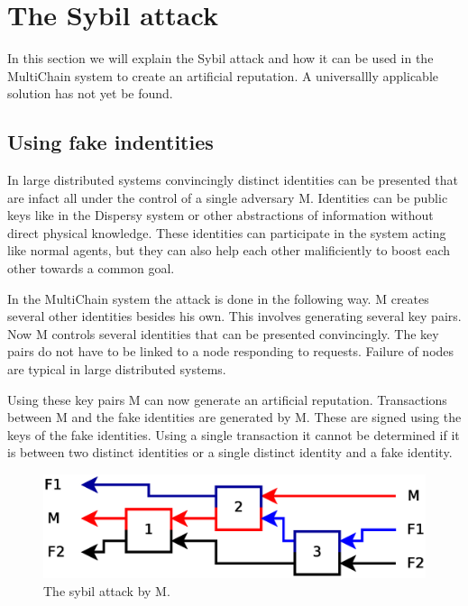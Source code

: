 \section{The Sybil attack}

In this section we will explain the Sybil attack\cite{douceur-sybil}
and how it can be used in the MultiChain system to create an artificial reputation.
A universallly applicable solution has not yet be found\cite{levine-sybilsurvey}.

\subsection{Using fake indentities}
In large distributed systems convincingly distinct identities can be presented
that are infact all under the control of a single adversary M.
Identities can be public keys like in the Dispersy system
or other abstractions of information without direct physical knowledge.
These identities can participate in the system acting like normal agents,
but they can also help each other malificiently to boost each other towards a common goal.

In the MultiChain system the attack is done in the following way.
M creates several other identities besides his own.
This involves generating several key pairs.
Now M controls several identities that can be presented convincingly.
The key pairs do not have to be linked to a node responding to requests.
Failure of nodes are typical in large distributed systems.

Using these key pairs M can now generate an artificial reputation.
Transactions between M and the fake identities are generated by M.
These are signed using the keys of the fake identities.
Using a single transaction it cannot be determined if it is between two distinct identities or a single distinct identity and a fake identity.

\begin{figure}
	\centerline{\includegraphics[scale=0.3]{problems/figs/sybil.eps}}
	\caption{The sybil attack by M.}
	\label{fig:sybil-example}
\end{figure}

